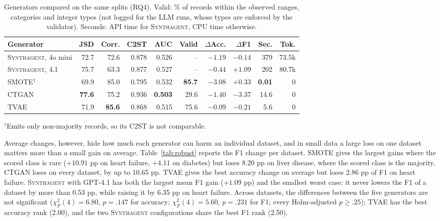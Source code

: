 \documentclass[conference]{IEEEtran}
\newcommand{\system}{\textsc{Synthagent}\xspace}
\newcommand{\best}[1]{\textbf{#1}}
\begin{document}
\begin{table}[t]
\centering
\caption{Generators compared on the same splits (RQ4). Valid: \% of records within the observed ranges, categories and integer types (not logged for the LLM runs, whose types are enforced by the validator). Seconds: API time for \system, CPU time otherwise.}
\label{tab:generators}
\scriptsize
\setlength{\tabcolsep}{1.5pt}
\begin{tabular*}{\columnwidth}{@{\extracolsep{\fill}}lrrrrrrrrr@{}}
\toprule
Generator & JSD & Corr. & C2ST & AUC & Valid & $\Delta$Acc. & $\Delta$F1 & Sec. & Tok. \\
\midrule
\system, 4o mini & 72.7 & 72.6 & 0.878 & 0.526 & -- & $-1.19$ & $-0.14$ & 379 & 73.5k \\
\system, 4.1 & 75.7 & 63.3 & 0.877 & 0.527 & -- & $-0.44$ & \best{$+1.09$} & 202 & 80.7k \\
SMOTE$^{\dagger}$ & 69.9 & 85.0 & 0.795 & 0.532 & \best{85.7} & $-3.08$ & $+0.33$ & \best{0.01} & 0 \\
CTGAN & \best{77.6} & 75.2 & 0.936 & \best{0.503} & 29.6 & $-1.40$ & $-3.37$ & 14.6 & 0 \\
TVAE & 71.9 & \best{85.6} & 0.868 & 0.515 & 75.6 & \best{$-0.09$} & $-0.21$ & 5.6 & 0 \\
\bottomrule
\end{tabular*}
\par\vspace{2pt}\raggedright\scriptsize $^{\dagger}$Emits only non-majority records, so its C2ST is not comparable.
\end{table}

Average changes, however, hide how much each generator can harm an individual dataset, and in small data a large loss on one dataset matters more than a small gain on average. Table~\ref{tab:robust} reports the F1 change per dataset. SMOTE gives the largest gains where the scored class is rare ($+10.91$ pp on heart failure, $+4.11$ on diabetes) but loses 8.20 pp on liver disease, where the scored class is the majority. CTGAN loses on every dataset, by up to 10.65 pp. TVAE gives the best accuracy change on average but loses 2.86 pp of F1 on heart failure. \system with GPT-4.1 has both the largest mean F1 gain ($+1.09$ pp) and the smallest worst case: it never lowers the F1 of a dataset by more than 0.53 pp, while raising it by 6.35 pp on heart failure. Across datasets, the differences between the five generators are not significant ($\chi^2_F(4)=6.80$, $p=.147$ for accuracy; $\chi^2_F(4)=5.60$, $p=.231$ for F1; every Holm-adjusted $p\ge.25$); TVAE has the best accuracy rank (2.00), and the two \system configurations share the best F1 rank (2.50).
\end{document}
